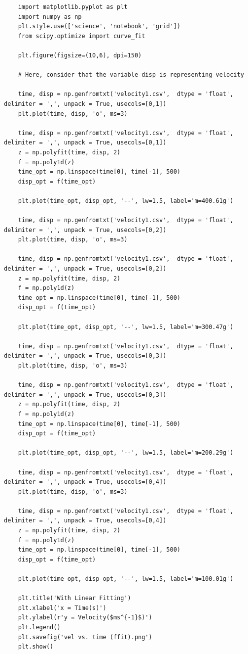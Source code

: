 \documentclass{article}
\begin{document}
\begin{lstlisting}
	import matplotlib.pyplot as plt
	import numpy as np
	plt.style.use(['science', 'notebook', 'grid'])
	from scipy.optimize import curve_fit
	
	plt.figure(figsize=(10,6), dpi=150)
	
	# Here, consider that the variable disp is representing velocity
	
	time, disp = np.genfromtxt('velocity1.csv',  dtype = 'float', delimiter = ',', unpack = True, usecols=[0,1])
	plt.plot(time, disp, 'o', ms=3)
	
	time, disp = np.genfromtxt('velocity1.csv',  dtype = 'float', delimiter = ',', unpack = True, usecols=[0,1])
	z = np.polyfit(time, disp, 2)
	f = np.poly1d(z)
	time_opt = np.linspace(time[0], time[-1], 500)
	disp_opt = f(time_opt)
	
	plt.plot(time_opt, disp_opt, '--', lw=1.5, label='m=400.61g')
	
	time, disp = np.genfromtxt('velocity1.csv',  dtype = 'float', delimiter = ',', unpack = True, usecols=[0,2])
	plt.plot(time, disp, 'o', ms=3)
	
	time, disp = np.genfromtxt('velocity1.csv',  dtype = 'float', delimiter = ',', unpack = True, usecols=[0,2])
	z = np.polyfit(time, disp, 2)
	f = np.poly1d(z)
	time_opt = np.linspace(time[0], time[-1], 500)
	disp_opt = f(time_opt)
	
	plt.plot(time_opt, disp_opt, '--', lw=1.5, label='m=300.47g')
	
	time, disp = np.genfromtxt('velocity1.csv',  dtype = 'float', delimiter = ',', unpack = True, usecols=[0,3])
	plt.plot(time, disp, 'o', ms=3)
	
	time, disp = np.genfromtxt('velocity1.csv',  dtype = 'float', delimiter = ',', unpack = True, usecols=[0,3])
	z = np.polyfit(time, disp, 2)
	f = np.poly1d(z)
	time_opt = np.linspace(time[0], time[-1], 500)
	disp_opt = f(time_opt)
	
	plt.plot(time_opt, disp_opt, '--', lw=1.5, label='m=200.29g')
	
	time, disp = np.genfromtxt('velocity1.csv',  dtype = 'float', delimiter = ',', unpack = True, usecols=[0,4])
	plt.plot(time, disp, 'o', ms=3)
	
	time, disp = np.genfromtxt('velocity1.csv',  dtype = 'float', delimiter = ',', unpack = True, usecols=[0,4])
	z = np.polyfit(time, disp, 2)
	f = np.poly1d(z)
	time_opt = np.linspace(time[0], time[-1], 500)
	disp_opt = f(time_opt)
	
	plt.plot(time_opt, disp_opt, '--', lw=1.5, label='m=100.01g')
	
	plt.title('With Linear Fitting')
	plt.xlabel('x = Time(s)')
	plt.ylabel(r'y = Velocity($ms^{-1}$)')
	plt.legend()
	plt.savefig('vel vs. time (ffit).png')
	plt.show()
\end{lstlisting}
\end{document}

